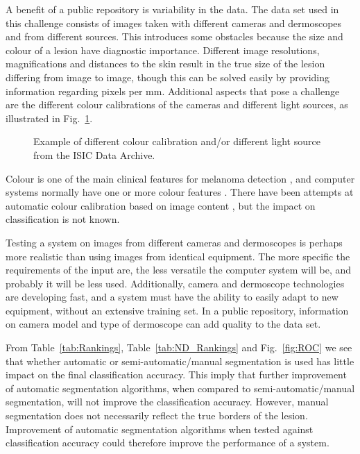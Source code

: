 \documentclass[a4paper,12pt]{article}
\begin{document}
A benefit of a public repository is variability in the data. 
The data set used in this challenge consists of images taken with different cameras and dermoscopes and from different sources. This introduces some obstacles because the size and colour of a lesion have diagnostic importance. 
Different image resolutions, magnifications and distances to the skin result in the true size of the lesion differing from image to image, though this can be solved easily by providing information regarding pixels per mm. 
Additional aspects that pose a challenge are the different colour calibrations of the cameras and different light sources, as illustrated in Fig.~\ref{fig:Colour}. 
  \begin{figure}[h!]
  \centering
        \caption{Example of different colour calibration and/or different light source from the ISIC Data Archive.}
        \label{fig:Colour}
   \end{figure}
Colour is one of the main clinical features for melanoma detection \citep{Argenziano2003Dermoscopy}, and computer systems normally have one or more colour features \citep{Korotkov2012Computerized}. 
There have been attempts at automatic colour calibration based on image content \citep{Iyatomi2011Automated}, but the impact on classification is not known. 

Testing a system on images from different cameras and dermoscopes is perhaps more realistic than using images from identical equipment. 
The more specific the requirements of the input are, the less versatile the computer system will be, and probably it will be less used. 
Additionally, camera and dermoscope technologies are developing fast, and a system must have the ability to easily adapt to new equipment, without an extensive training set. 
In a public repository, information on camera model and type of dermoscope can add quality to the data set.   

From Table~\ref{tab:Rankings}, Table~\ref{tab:ND_Rankings} and Fig.~\ref{fig:ROC} we see that whether automatic or semi-automatic/manual segmentation is used has little impact on the final classification accuracy.
This imply that further improvement of automatic segmentation algorithms, when compared to semi-automatic/manual segmentation,  will not improve the classification accuracy.
However, manual segmentation does not necessarily reflect the true borders of the lesion.
Improvement of automatic segmentation algorithms when tested against classification accuracy could therefore improve the performance of a system. 
\end{document}
